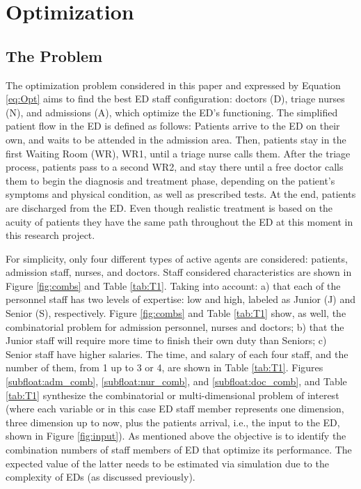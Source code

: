 \documentclass[11pt]{article} %
\begin{document}
\section{Optimization}
\label{sec:optimal}

\subsection{The Problem}
\label{sec:desc}

The optimization problem  considered in this paper and expressed by Equation \eqref{eq:Opt} aims to find the best ED staff configuration: doctors (D), triage nurses (N), and admissions (A), which optimize the ED's functioning. The simplified  patient flow in the ED is defined as follows:  Patients arrive to the ED on their own, and waits to be attended in the admission area. Then, patients stay in the first Waiting Room (WR), WR1, until a triage nurse calls them. After the triage process, patients pass to a second WR2, and stay there until a free doctor calls them to begin the diagnosis and treatment phase, depending on the patient's symptoms and physical condition, as well as prescribed tests. At the end, patients are discharged from the ED. Even though realistic treatment is based on the acuity of patients they have the same path throughout the ED at this moment in this research project.


For simplicity, only four different types of active agents are considered: patients, admission staff, nurses, and doctors. Staff  considered characteristics are shown in Figure \ref{fig:combs} and Table \ref{tab:T1}. Taking into account: a) that each of the personnel staff has two levels of expertise:  low and high, labeled as Junior (J) and Senior (S), respectively. Figure \ref{fig:combs} and Table \ref{tab:T1}  show, as well, the combinatorial problem for admission personnel, nurses and doctors; b) that the Junior staff will require more time to finish their own duty than Seniors; c) Senior staff have higher salaries. The time, and salary of each four staff, and the number of them, from 1 up to 3 or 4, are shown in Table \ref{tab:T1}.  Figures \ref{subfloat:adm_comb}, \ref{subfloat:nur_comb}, and \ref{subfloat:doc_comb}, and Table \ref{tab:T1}  synthesize the combinatorial or multi-dimensional problem of interest (where each variable or in this case ED staff member represents one dimension, three dimension up to now, plus the patients arrival, i.e., the input to the ED, shown in Figure \ref{fig:input}).  As mentioned above the objective is to identify the combination numbers of staff members of ED that optimize its performance. The expected value of the latter needs to be estimated via simulation due to the complexity of EDs (as discussed previously).
\end{document}
